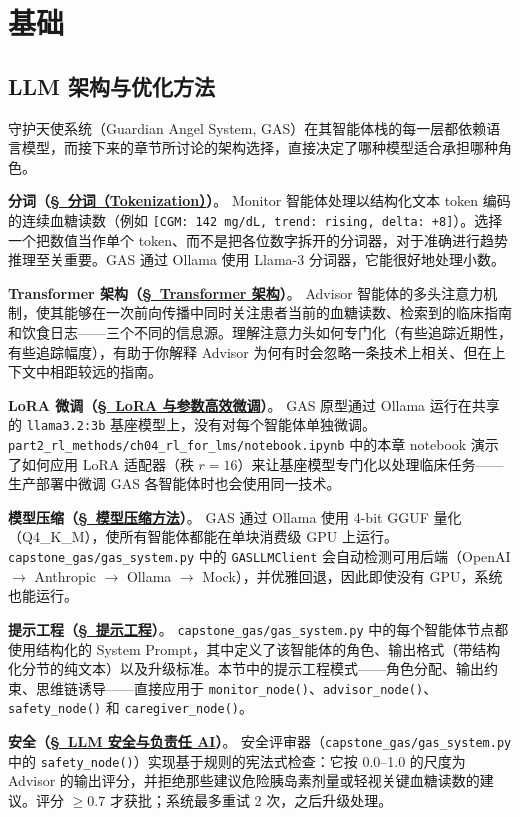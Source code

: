 \part{基础}

\chapter{LLM 架构与优化方法}
\label{llm-architecture-and-optimization-methods}

\begin{keybox}
守护天使系统（Guardian Angel System, GAS）在其智能体栈的每一层都依赖语言模型，而接下来的章节所讨论的架构选择，直接决定了哪种模型适合承担哪种角色。

\textbf{分词（\hyperref[sec:tokenization]{\S~分词（Tokenization）}）}。
Monitor 智能体处理以结构化文本 token 编码的连续血糖读数（例如 \texttt{[CGM: 142 mg/dL, trend: rising, delta: +8]}）。选择一个把数值当作单个 token、而不是把各位数字拆开的分词器，对于准确进行趋势推理至关重要。GAS 通过 Ollama 使用 Llama-3 分词器，它能很好地处理小数。

\textbf{Transformer 架构（\hyperref[the-transformer-architecture]{\S~Transformer 架构}）}。
Advisor 智能体的多头注意力机制，使其能够在一次前向传播中同时关注患者当前的血糖读数、检索到的临床指南和饮食日志——三个不同的信息源。理解注意力头如何专门化（有些追踪近期性，有些追踪幅度），有助于你解释 Advisor 为何有时会忽略一条技术上相关、但在上下文中相距较远的指南。

\textbf{LoRA 微调（\hyperref[lora-and-parameter-efficient-fine-tuning]{\S~LoRA 与参数高效微调}）}。
GAS 原型通过 Ollama 运行在共享的 \texttt{llama3.2:3b} 基座模型上，没有对每个智能体单独微调。\texttt{part2\_rl\_methods/ch04\_rl\_for\_lms/notebook.ipynb} 中的本章 notebook 演示了如何应用 LoRA 适配器（秩 $r=16$）来让基座模型专门化以处理临床任务——生产部署中微调 GAS 各智能体时也会使用同一技术。

\textbf{模型压缩（\hyperref[model-compression-methods]{\S~模型压缩方法}）}。
GAS 通过 Ollama 使用 4-bit GGUF 量化（Q4\_K\_M），使所有智能体都能在单块消费级 GPU 上运行。\texttt{capstone\_gas/gas\_system.py} 中的 \texttt{GASLLMClient} 会自动检测可用后端（OpenAI $\to$ Anthropic $\to$ Ollama $\to$ Mock），并优雅回退，因此即使没有 GPU，系统也能运行。

\textbf{提示工程（\hyperref[sec:prompt-engineering]{\S~提示工程}）}。
\texttt{capstone\_gas/gas\_system.py} 中的每个智能体节点都使用结构化的 System Prompt，其中定义了该智能体的角色、输出格式（带结构化分节的纯文本）以及升级标准。本节中的提示工程模式——角色分配、输出约束、思维链诱导——直接应用于 \texttt{monitor\_node()}、\texttt{advisor\_node()}、\texttt{safety\_node()} 和 \texttt{caregiver\_node()}。

\textbf{安全（\hyperref[sec:safety]{\S~LLM 安全与负责任 AI}）}。
安全评审器（\texttt{capstone\_gas/gas\_system.py} 中的 \texttt{safety\_node()}）实现基于规则的宪法式检查：它按 0.0--1.0 的尺度为 Advisor 的输出评分，并拒绝那些建议危险胰岛素剂量或轻视关键血糖读数的建议。评分 $\geq 0.7$ 才获批；系统最多重试 2 次，之后升级处理。
\end{keybox}

